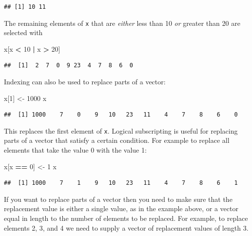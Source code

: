 \documentclass[
]{book}
\newenvironment{Shaded}{\begin{snugshade}}{\end{snugshade}}
\newcommand{\DecValTok}[1]{\textcolor[rgb]{0.00,0.00,0.81}{#1}}
\newcommand{\NormalTok}[1]{#1}
\newcommand{\OtherTok}[1]{\textcolor[rgb]{0.56,0.35,0.01}{#1}}
\newcommand{\SpecialCharTok}[1]{\textcolor[rgb]{0.81,0.36,0.00}{\textbf{#1}}}
\begin{document}
\begin{verbatim}
## [1] 10 11
\end{verbatim}

The remaining elements of \texttt{x} that are \emph{either} less than 10
\emph{or} greater than 20 are selected with

\begin{Shaded}
\begin{Highlighting}[]
\NormalTok{x[x }\SpecialCharTok{\textless{}} \DecValTok{10} \SpecialCharTok{|}\NormalTok{ x }\SpecialCharTok{\textgreater{}} \DecValTok{20}\NormalTok{]}
\end{Highlighting}
\end{Shaded}

\begin{verbatim}
##  [1]  2  7  0  9 23  4  7  8  6  0
\end{verbatim}

Indexing can also be used to replace parts of a vector:

\begin{Shaded}
\begin{Highlighting}[]
\NormalTok{x[}\DecValTok{1}\NormalTok{] }\OtherTok{\textless{}{-}} \DecValTok{1000}
\NormalTok{x}
\end{Highlighting}
\end{Shaded}

\begin{verbatim}
##  [1] 1000    7    0    9   10   23   11    4    7    8    6    0
\end{verbatim}

This replaces the first element of \texttt{x}. Logical subscripting is
useful for replacing parts of a vector that satisfy a certain condition.
For example to replace all elements that take the value 0 with the value 1:

\begin{Shaded}
\begin{Highlighting}[]
\NormalTok{x[x }\SpecialCharTok{==} \DecValTok{0}\NormalTok{] }\OtherTok{\textless{}{-}} \DecValTok{1}
\NormalTok{x}
\end{Highlighting}
\end{Shaded}

\begin{verbatim}
##  [1] 1000    7    1    9   10   23   11    4    7    8    6    1
\end{verbatim}

If you want to replace parts of a vector then you need to make sure
that the replacement value is either a single value, as in the example
above, or a vector equal in length to the number of elements to be
replaced. For example, to replace elements 2, 3, and 4 we need to
supply a vector of replacement values of length 3.
\end{document}
